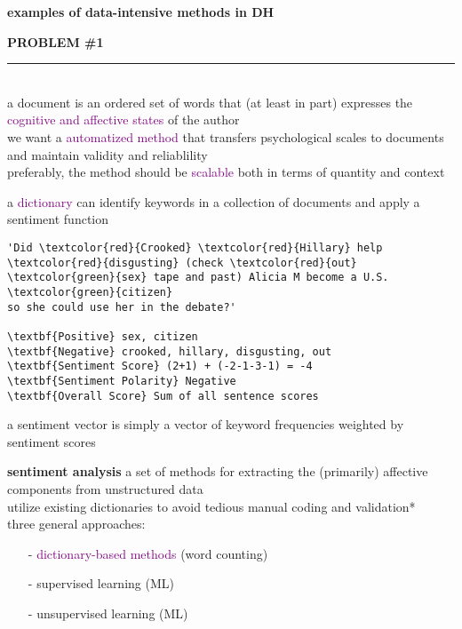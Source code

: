\documentclass[8pt]{beamer}
\begin{document}
\begin{frame}
	\begin{center}
		\textbf{examples of data-intensive methods in DH}
	\end{center}
\end{frame}

\begin{frame}
\textbf{PROBLEM \#1}\\
\noindent\rule{1cm}{0.4pt}\\
a document is an ordered set of words that (at least in part) expresses the \textcolor{purple}{cognitive and affective states} of the author\\
\medskip
we want a \textcolor{purple}{automatized method} that transfers psychological scales to documents and maintain validity and reliablility\\
\medskip 
preferably, the method should be \textcolor{purple}{scalable} both in terms of quantity and context\\
\end{frame}

\begin{frame}[fragile]
a \textcolor{purple}{dictionary} can identify keywords in a collection of documents and apply a sentiment function\\
\medskip
\begin{Verbatim}
'Did \textcolor{red}{Crooked} \textcolor{red}{Hillary} help \textcolor{red}{disgusting} (check \textcolor{red}{out} \textcolor{green}{sex} tape and past) Alicia M become a U.S. \textcolor{green}{citizen} 
so she could use her in the debate?'
 
\textbf{Positive} sex, citizen
\textbf{Negative} crooked, hillary, disgusting, out
\textbf{Sentiment Score} (2+1) + (-2-1-3-1) = -4 
\textbf{Sentiment Polarity} Negative
\textbf{Overall Score} Sum of all sentence scores
\end{Verbatim}
\medskip
a sentiment vector is simply a vector of keyword frequencies weighted by sentiment scores\\
\end{frame}

\begin{frame}
\textbf{sentiment analysis} a set of methods for extracting the (primarily) affective components from unstructured data\\ 
\medskip
utilize existing dictionaries to avoid tedious manual coding and validation*\\ 
\medskip
three general approaches:\\
\begin{itemize}
\item[-] \textcolor{purple}{dictionary-based methods} (word counting)
\item[-] supervised learning (ML)
\item[-] unsupervised learning (ML)
\end{itemize}
\end{frame}
\end{document}
